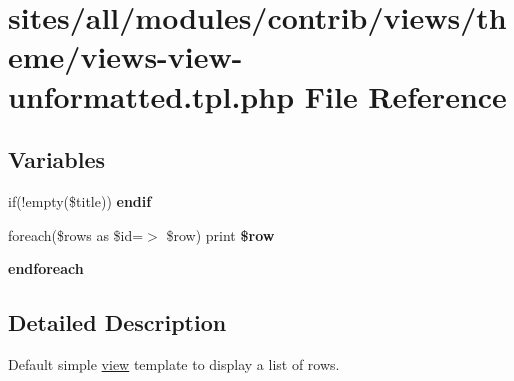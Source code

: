 \hypertarget{views-view-unformatted_8tpl_8php}{
\section{sites/all/modules/contrib/views/theme/views-view-unformatted.tpl.php File Reference}
\label{views-view-unformatted_8tpl_8php}
}
\subsection*{Variables}
\begin{CompactItemize}
\item 
\hypertarget{views-view-unformatted_8tpl_8php_de91bc69a503a5ab88f3fdb968225b63}{
if(!empty(\$title)) \textbf{endif}}
\label{views-view-unformatted_8tpl_8php_de91bc69a503a5ab88f3fdb968225b63}

\item 
\hypertarget{views-view-unformatted_8tpl_8php_f50a7f2d493c1886630359887894e53e}{
foreach(\$rows as \$id=$>$ \$row) print \textbf{\$row}}
\label{views-view-unformatted_8tpl_8php_f50a7f2d493c1886630359887894e53e}

\item 
\hypertarget{views-view-unformatted_8tpl_8php_672d9707ef91db026c210f98cc601123}{
\textbf{endforeach}}
\label{views-view-unformatted_8tpl_8php_672d9707ef91db026c210f98cc601123}

\end{CompactItemize}


\subsection{Detailed Description}
Default simple \hyperlink{classview}{view} template to display a list of rows. 